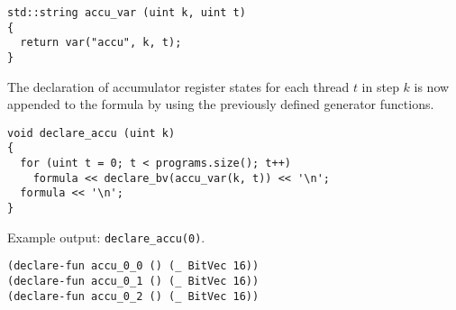 \begin{lstlisting}[style=c++]
std::string accu_var (uint k, uint t)
{
  return var("accu", k, t);
}
\end{lstlisting}

\noindent
The declaration of accumulator register states for each thread $t$ in step $k$ is now appended to the formula by using the previously defined generator functions.

\begin{lstlisting}[style=c++]
void declare_accu (uint k)
{
  for (uint t = 0; t < programs.size(); t++)
    formula << declare_bv(accu_var(k, t)) << '\n';
  formula << '\n';
}
\end{lstlisting}

\noindent
Example output: \lstinline[style=c++]{declare_accu(0)}.

% 
\begin{lstlisting}[language=SMTLib]
(declare-fun accu_0_0 () (_ BitVec 16))
(declare-fun accu_0_1 () (_ BitVec 16))
(declare-fun accu_0_2 () (_ BitVec 16))
\end{lstlisting}

